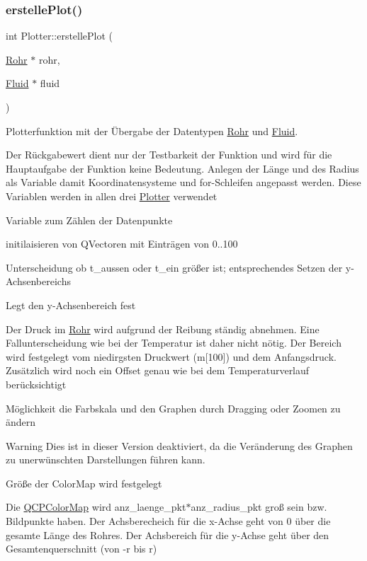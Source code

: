 \subsubsection{\texorpdfstring{erstelle\+Plot()}{erstellePlot()}}
{\footnotesize\ttfamily int Plotter\+::erstelle\+Plot (\begin{DoxyParamCaption}\item[{\hyperlink{class_rohr}{Rohr} $\ast$}]{rohr,  }\item[{\hyperlink{class_fluid}{Fluid} $\ast$}]{fluid }\end{DoxyParamCaption})}



Plotterfunktion mit der Übergabe der Datentypen \hyperlink{class_rohr}{Rohr} und \hyperlink{class_fluid}{Fluid}. 

Der Rückgabewert dient nur der Testbarkeit der Funktion und wird für die Hauptaufgabe der Funktion keine Bedeutung. Anlegen der Länge und des Radius als Variable damit Koordinatensysteme und for-\/\+Schleifen angepasst werden. Diese Variablen werden in allen drei \hyperlink{class_plotter}{Plotter} verwendet

Variable zum Zählen der Datenpunkte

initilaisieren von Q\+Vectoren mit Einträgen von 0..100

Unterscheidung ob t\+\_\+aussen oder t\+\_\+ein größer ist; entsprechendes Setzen der y-\/\+Achsenbereichs

Legt den y-\/\+Achsenbereich fest

Der Druck im \hyperlink{class_rohr}{Rohr} wird aufgrund der Reibung ständig abnehmen. Eine Fallunterscheidung wie bei der Temperatur ist daher nicht nötig. Der Bereich wird festgelegt vom niedirgsten Druckwert (m\mbox{[}100\mbox{]}) und dem Anfangsdruck. Zusätzlich wird noch ein Offset genau wie bei dem Temperaturverlauf berücksichtigt

Möglichkeit die Farbskala und den Graphen durch Dragging oder Zoomen zu ändern \begin{DoxyWarning}{Warning}
Dies ist in dieser Version deaktiviert, da die Veränderung des Graphen zu unerwünschten Darstellungen führen kann.
\end{DoxyWarning}
Größe der Color\+Map wird festgelegt

Die \hyperlink{class_q_c_p_color_map}{Q\+C\+P\+Color\+Map} wird anz\+\_\+laenge\+\_\+pkt$\ast$anz\+\_\+radius\+\_\+pkt groß sein bzw. Bildpunkte haben. Der Achsberecheich für die x-\/\+Achse geht von 0 über die gesamte Länge des Rohres. Der Achsbereich für die y-\/\+Achse geht über den Gesamtenquerschnitt (von -\/r bis r)

